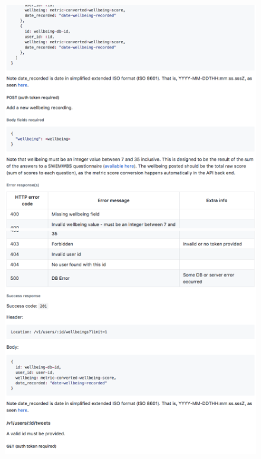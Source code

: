 \documentclass[11pt,openright,a4paper]{report}
\begin{document}
\begin{appendices}
\begin{figure}[ht]
  \centering
  \includegraphics[width=.9\textwidth]{i/apidocs11.png}
  \includegraphics[width=.9\textwidth]{i/apidocs12.png}
\end{figure}


\end{appendices}
\end{document}
